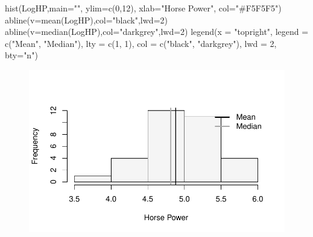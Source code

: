 \documentclass[
  letterpaper,
  DIV=11,
  numbers=noendperiod]{scrreprt}
\newenvironment{Shaded}{\begin{snugshade}}{\end{snugshade}}
\newcommand{\AttributeTok}[1]{\textcolor[rgb]{0.40,0.45,0.13}{#1}}
\newcommand{\DecValTok}[1]{\textcolor[rgb]{0.68,0.00,0.00}{#1}}
\newcommand{\FunctionTok}[1]{\textcolor[rgb]{0.28,0.35,0.67}{#1}}
\newcommand{\NormalTok}[1]{\textcolor[rgb]{0.00,0.23,0.31}{#1}}
\newcommand{\StringTok}[1]{\textcolor[rgb]{0.13,0.47,0.30}{#1}}
\begin{document}
\begin{Shaded}
\begin{Highlighting}[numbers=left,,]
\FunctionTok{hist}\NormalTok{(LogHP,}\AttributeTok{main=}\StringTok{""}\NormalTok{, }\AttributeTok{ylim=}\FunctionTok{c}\NormalTok{(}\DecValTok{0}\NormalTok{,}\DecValTok{12}\NormalTok{), }\AttributeTok{xlab=}\StringTok{"Horse Power"}\NormalTok{, }
     \AttributeTok{col=}\StringTok{"\#F5F5F5"}\NormalTok{)}
\FunctionTok{abline}\NormalTok{(}\AttributeTok{v=}\FunctionTok{mean}\NormalTok{(LogHP),}\AttributeTok{col=}\StringTok{"black"}\NormalTok{,}\AttributeTok{lwd=}\DecValTok{2}\NormalTok{)}
\FunctionTok{abline}\NormalTok{(}\AttributeTok{v=}\FunctionTok{median}\NormalTok{(LogHP),}\AttributeTok{col=}\StringTok{"darkgrey"}\NormalTok{,}\AttributeTok{lwd=}\DecValTok{2}\NormalTok{)}
\FunctionTok{legend}\NormalTok{(}\AttributeTok{x =} \StringTok{"topright"}\NormalTok{,          }
       \AttributeTok{legend =} \FunctionTok{c}\NormalTok{(}\StringTok{"Mean"}\NormalTok{, }\StringTok{"Median"}\NormalTok{),  }
       \AttributeTok{lty =} \FunctionTok{c}\NormalTok{(}\DecValTok{1}\NormalTok{, }\DecValTok{1}\NormalTok{),           }
       \AttributeTok{col =} \FunctionTok{c}\NormalTok{(}\StringTok{"black"}\NormalTok{, }\StringTok{"darkgrey"}\NormalTok{),         }
       \AttributeTok{lwd =} \DecValTok{2}\NormalTok{,}
       \AttributeTok{bty=}\StringTok{"n"}\NormalTok{)    }
\end{Highlighting}
\end{Shaded}

\begin{figure}[H]

{\centering \includegraphics{./06-DescriptiveV_files/figure-pdf/unnamed-chunk-14-1.pdf}

}

\end{figure}
\end{document}
